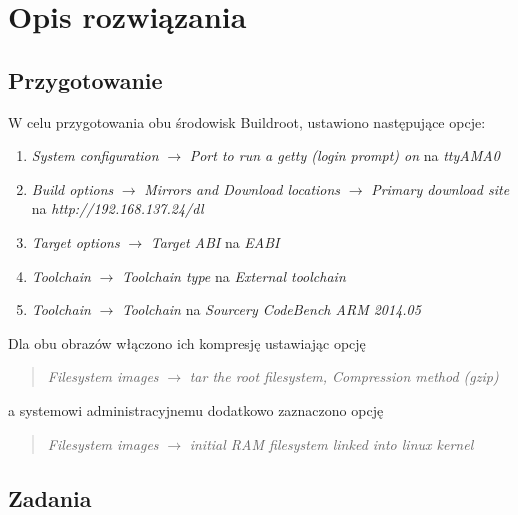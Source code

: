 \documentclass[10pt,a4paper]{article}
\begin{document}
\section{Opis rozwiązania}
\subsection{Przygotowanie}
W celu przygotowania obu środowisk Buildroot, ustawiono następujące opcje:
\begin{enumerate}
	\item \textit{System configuration} $\rightarrow$ \textit{Port to run a getty (login prompt) on} na \textit{ttyAMA0}
	\item \textit{Build options} $\rightarrow$ \textit{Mirrors and Download locations} $\rightarrow$ \textit{Primary download site}\\
	na \textit{http://192.168.137.24/dl}
	\item \textit{Target options} $\rightarrow$ \textit{Target ABI} na \textit{EABI}
	\item \textit{Toolchain} $\rightarrow$ \textit{Toolchain type} na \textit{External toolchain}
	\item \textit{Toolchain} $\rightarrow$ \textit{Toolchain} na \textit{Sourcery CodeBench ARM 2014.05}
\end{enumerate}
Dla obu obrazów włączono ich kompresję ustawiając opcję
\begin{quote}
	\textit{Filesystem images} $\rightarrow$ \textit{tar the root filesystem, Compression method (gzip)}
\end{quote}
a systemowi administracyjnemu dodatkowo zaznaczono opcję
\begin{quote}
	\textit{Filesystem images} $\rightarrow$ \textit{initial RAM filesystem linked into linux kernel}
\end{quote}

\subsection{Zadania}
\end{document}

